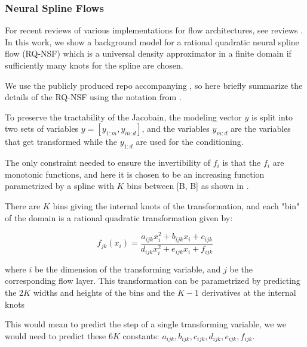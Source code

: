 \FloatBarrier
\clearpage
\subsubsection{Neural Spline Flows}

For recent reviews of various implementations for flow architectures, see reviews \cite{1910.13233, 1912.02762}. In this work, we show a background model for a rational quadratic neural spline flow (RQ-NSF) \cite{1906.04032} which is a universal density approximator in a finite domain if sufficiently many knots for the spline are chosen.

We use the publicly produced repo \cite{https://github.com/bayesiains/nflows} accompanying \cite{1906.04032}, so here briefly summarize the details of the RQ-NSF using the notation from \cite{1906.04032}.

To preserve the tractability of the Jacobain, the modeling vector $y$ is split into two sets of variables $y = [y_{1:m}, y_{m:d}]$, and the variables $y_{m:d}$ are the variables that get transformed while the $y_{1:d}$ are used for the conditioning.

The only constraint needed to ensure the invertibility of $f_i$ is that the $f_i$ are monotonic functions, and here it is chosen to be an increasing function parametrized by a spline with $K$ bins between [B, B] as shown in \Fig{\ref{fig:nsf-graphic}}.

There are $K$ bins giving the internal knots of the transformation, and each "bin" of the domain is a rational quadratic transformation given by:

$$f_{jk}(x_i) = \frac{a_{ijk} x_i^2 + b_{ijk} x_i + c_{ijk} } { d_{ijk} x_i^2 + e_{ijk} x_i + f_{ijk}} $$

where $i$ be the dimension of the transforming variable, and $j$ be the corresponding flow layer.
This transformation can be parametrized by predicting the $2K$ widths and heights of the bins and the $K-1$ derivatives at the internal knots 

This would mean to predict the step of a single transforming variable, we we would need to predict these $6K$ constants: $a_{ijk},b_{ijk},c_{ijk},d_{ijk},e_{ijk},f_{ijk}$.

